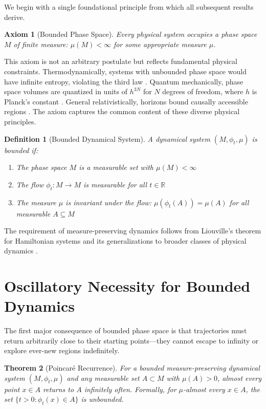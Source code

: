 \documentclass[twocolumn,10pt,a4paper]{article}
\newtheorem{theorem}{Theorem}[section]
\newtheorem{definition}[theorem]{Definition}
\newtheorem{axiom}{Axiom}
\newcommand{\R}{\mathbb{R}}
\begin{document}
We begin with a single foundational principle from which all subsequent results derive.

\begin{axiom}[Bounded Phase Space]
\label{ax:bounded}
Every physical system occupies a phase space $M$ of finite measure: $\mu(M) < \infty$ for some appropriate measure $\mu$.
\end{axiom}

This axiom is not an arbitrary postulate but reflects fundamental physical constraints. Thermodynamically, systems with unbounded phase space would have infinite entropy, violating the third law \citep{nernst1906warmesatz}. Quantum mechanically, phase space volumes are quantized in units of $h^{3N}$ for $N$ degrees of freedom, where $h$ is Planck's constant \citep{planck1901gesetz}. General relativistically, horizons bound causally accessible regions \citep{bekenstein1973black}. The axiom captures the common content of these diverse physical principles.

\begin{definition}[Bounded Dynamical System]
A dynamical system $(M, \phi_t, \mu)$ is \emph{bounded} if:
\begin{enumerate}[label=(\roman*)]
    \item The phase space $M$ is a measurable set with $\mu(M) < \infty$
    \item The flow $\phi_t: M \to M$ is measurable for all $t \in \R$
    \item The measure $\mu$ is invariant under the flow: $\mu(\phi_t(A)) = \mu(A)$ for all measurable $A \subseteq M$
\end{enumerate}
\end{definition}

The requirement of measure-preserving dynamics follows from Liouville's theorem for Hamiltonian systems \citep{liouville1838note} and its generalizations to broader classes of physical dynamics \citep{arnold1989mathematical}.

\section{Oscillatory Necessity for Bounded Dynamics}
\label{sec:oscillation}

The first major consequence of bounded phase space is that trajectories must return arbitrarily close to their starting points---they cannot escape to infinity or explore ever-new regions indefinitely.

\begin{theorem}[Poincar\'{e} Recurrence]
\label{thm:poincare}
For a bounded measure-preserving dynamical system $(M, \phi_t, \mu)$ and any measurable set $A \subset M$ with $\mu(A) > 0$, almost every point $x \in A$ returns to $A$ infinitely often. Formally, for $\mu$-almost every $x \in A$, the set $\{t > 0 : \phi_t(x) \in A\}$ is unbounded.
\end{theorem}
\end{document}
